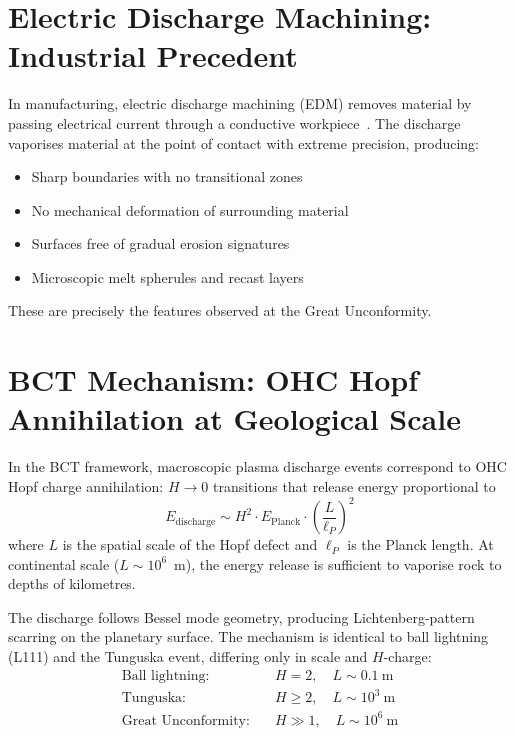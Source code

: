 \documentclass[aps,prl,twocolumn,superscriptaddress]{revtex4-2}
\begin{document}
\section{Electric Discharge Machining: Industrial Precedent}

In manufacturing, electric discharge machining (EDM) removes material by passing electrical current through a conductive workpiece~\cite{Ho2003}. The discharge vaporises material at the point of contact with extreme precision, producing:
\begin{itemize}
\item Sharp boundaries with no transitional zones
\item No mechanical deformation of surrounding material
\item Surfaces free of gradual erosion signatures
\item Microscopic melt spherules and recast layers
\end{itemize}
These are precisely the features observed at the Great Unconformity.

\section{BCT Mechanism: OHC Hopf Annihilation at Geological Scale}

In the BCT framework, macroscopic plasma discharge events correspond to OHC Hopf charge annihilation: $H \to 0$ transitions that release energy proportional to
\begin{equation}
E_{\mathrm{discharge}} \sim H^2 \cdot E_{\mathrm{Planck}} \cdot \left(\frac{L}{\ell_P}\right)^2
\end{equation}
where $L$ is the spatial scale of the Hopf defect and $\ell_P$ is the Planck length. At continental scale ($L \sim 10^6$~m), the energy release is sufficient to vaporise rock to depths of kilometres.

The discharge follows Bessel mode geometry, producing Lichtenberg-pattern scarring on the planetary surface. The mechanism is identical to ball lightning (L111) and the Tunguska event, differing only in scale and $H$-charge:
\begin{align}
\text{Ball lightning:} &\quad H = 2, \quad L \sim 0.1~\text{m} \\
\text{Tunguska:} &\quad H \geq 2, \quad L \sim 10^3~\text{m} \\
\text{Great Unconformity:} &\quad H \gg 1, \quad L \sim 10^6~\text{m}
\end{align}
\end{document}
